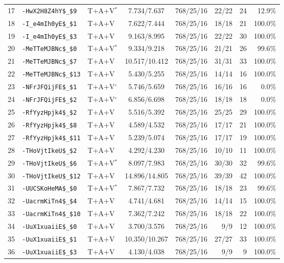 \begin{table}[!ht]
\begin{tabular}{rllccrrr}
17 & \texttt{-HwX2H8Z4hY\$\_\$9} & T+A+V$^{*}$ & 7.734/7.637 & 768/25/16 & 22/22 & 24 & 12.9\% \\
18 & \texttt{-I\_e4mIh0yE\$\_\$1} & T+A+V & 7.622/7.444 & 768/25/16 & 18/18 & 21 & 100.0\% \\
19 & \texttt{-I\_e4mIh0yE\$\_\$3} & T+A+V & 9.163/8.995 & 768/25/16 & 22/22 & 30 & 100.0\% \\
20 & \texttt{-MeTTeMJBNc\$\_\$0} & T+A+V$^{*}$ & 9.334/9.218 & 768/25/16 & 21/21 & 26 & 99.6\% \\
21 & \texttt{-MeTTeMJBNc\$\_\$7} & T+A+V & 10.517/10.412 & 768/25/16 & 31/31 & 33 & 100.0\% \\
22 & \texttt{-MeTTeMJBNc\$\_\$13} & T+A+V & 5.430/5.255 & 768/25/16 & 14/14 & 16 & 100.0\% \\
23 & \texttt{-NFrJFQijFE\$\_\$1} & T+A+V$^{\circ}$ & 5.746/5.659 & 768/25/16 & 16/16 & 16 & 0.0\% \\
24 & \texttt{-NFrJFQijFE\$\_\$2} & T+A+V$^{\circ}$ & 6.856/6.698 & 768/25/16 & 18/18 & 18 & 0.0\% \\
25 & \texttt{-RfYyzHpjk4\$\_\$2} & T+A+V & 5.516/5.392 & 768/25/16 & 25/25 & 29 & 100.0\% \\
26 & \texttt{-RfYyzHpjk4\$\_\$8} & T+A+V & 4.589/4.532 & 768/25/16 & 17/17 & 21 & 100.0\% \\
27 & \texttt{-RfYyzHpjk4\$\_\$11} & T+A+V & 5.239/5.074 & 768/25/16 & 17/17 & 19 & 100.0\% \\
28 & \texttt{-THoVjtIkeU\$\_\$2} & T+A+V & 4.292/4.230 & 768/25/16 & 10/10 & 11 & 100.0\% \\
29 & \texttt{-THoVjtIkeU\$\_\$6} & T+A+V$^{*}$ & 8.097/7.983 & 768/25/16 & 30/30 & 32 & 99.6\% \\
30 & \texttt{-THoVjtIkeU\$\_\$12} & T+A+V & 14.896/14.805 & 768/25/16 & 39/39 & 42 & 100.0\% \\
31 & \texttt{-UUCSKoHeMA\$\_\$0} & T+A+V$^{*}$ & 7.867/7.732 & 768/25/16 & 18/18 & 23 & 99.6\% \\
32 & \texttt{-UacrmKiTn4\$\_\$4} & T+A+V & 4.741/4.681 & 768/25/16 & 14/14 & 15 & 100.0\% \\
33 & \texttt{-UacrmKiTn4\$\_\$10} & T+A+V & 7.362/7.242 & 768/25/16 & 18/18 & 22 & 100.0\% \\
34 & \texttt{-UuX1xuaiiE\$\_\$0} & T+A+V & 3.700/3.576 & 768/25/16 & 9/9 & 12 & 100.0\% \\
35 & \texttt{-UuX1xuaiiE\$\_\$1} & T+A+V & 10.350/10.267 & 768/25/16 & 27/27 & 33 & 100.0\% \\
36 & \texttt{-UuX1xuaiiE\$\_\$3} & T+A+V & 4.130/4.038 & 768/25/16 & 9/9 & 9 & 100.0\% \\

\end{tabular}
\end{table}

